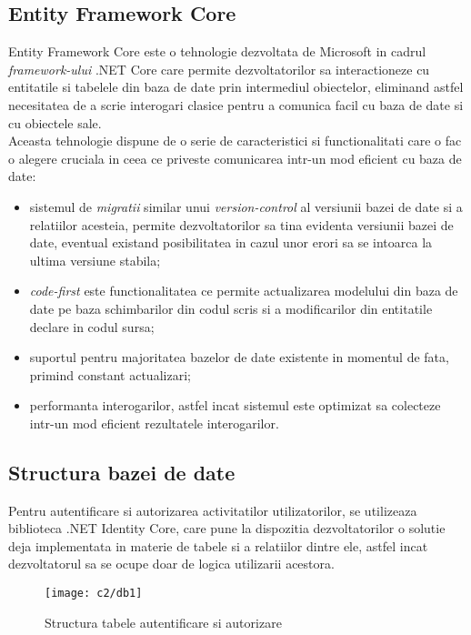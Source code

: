  \subsection*{Entity Framework Core}
Entity Framework Core este o tehnologie dezvoltata de Microsoft in cadrul \textit{framework-ului} .NET Core care permite dezvoltatorilor sa interactioneze cu entitatile si tabelele din baza de date prin intermediul obiectelor, eliminand astfel necesitatea de a scrie interogari clasice pentru a comunica facil cu baza de date si cu obiectele sale.\\
Aceasta tehnologie dispune de o serie de caracteristici si functionalitati care o fac o alegere cruciala in ceea ce priveste comunicarea intr-un mod eficient cu baza de date:
\begin{itemize}
	
	\item sistemul de \textit{migratii} similar unui \textit{version-control} al versiunii bazei de date si a relatiilor acesteia, permite dezvoltatorilor sa tina evidenta versiunii bazei de date, eventual existand posibilitatea in cazul unor erori sa se intoarca la ultima versiune stabila;
	
	\item \textit{code-first} este functionalitatea ce permite actualizarea modelului din baza de date pe baza schimbarilor din codul scris si a modificarilor din entitatile declare in codul sursa;
	
	\item suportul pentru majoritatea bazelor de date existente in momentul de fata, primind constant actualizari;
	
	\item performanta interogarilor, astfel incat sistemul este optimizat sa colecteze intr-un mod eficient rezultatele interogarilor.
	 
\end{itemize}

\subsection*{Structura bazei de date}

Pentru autentificare si autorizarea activitatilor utilizatorilor, se utilizeaza biblioteca .NET Identity Core, care pune la dispozitia dezvoltatorilor o solutie deja implementata in materie de tabele si a relatiilor dintre ele, astfel incat dezvoltatorul sa se ocupe doar de logica utilizarii acestora.
 
\vspace{1cm}
\begin{figure}[h]
	\centering
	
	\texttt{[image: c2/db1]}
	\caption{Structura tabele autentificare si autorizare}
\end{figure}

